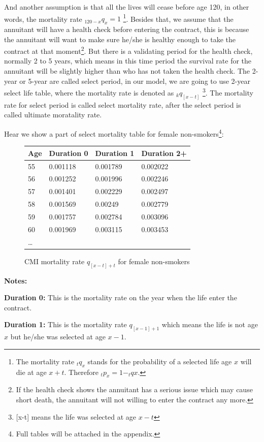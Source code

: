 \documentclass{report}
\begin{document}
And another assumption is that all the lives will cease before age 120, in other words, the mortality rate $_{120-x}q_{x}=1$ \footnote{The mortality rate $_tq_{x}$ stands for the probability of a selected life age $x$ will die at age $x+t$. Therefore $_tp_{x} = 1- _tq{x}$.}. Besides that, we assume that the annuitant will have a health check before entering the contract, this is because the annuitant will want to make sure he/she is healthy enough to take the contract at that moment\footnote{If the health check shows the annuitant has a serious issue which may cause short death, the annuitant will not willing to enter the contract any more.}. But there is a validating period for the health check, normally 2 to 5 years, which means in this time period the survival rate for the annuitant will be slightly higher than who has not taken the health check. The 2-year or 5-year are called select period, in our model, we are going to use 2-year select life table, where the mortality rate is denoted as $_kq_{[x-t]}$ \footnote{[x-t] means the life was selected at age $x-t$}. The mortality rate for select period is called select mortality rate, after the select period is called ultimate moratality rate.

Hear we show a part of select mortality table for female non-smokers\footnote{Full tables will be attached in the appendix.}:



\begin{figure}[H]
    \centering
\begin{tabular}{p{2cm}p{2cm}p{2cm}p{2cm}}
Age              & Duration 0 & Duration 1 & Duration 2+    \\
\hline
55&0.001118&0.001789&0.002022    \\
56&0.001252&0.001996&0.002246  \\
57&0.001401&0.002229&0.002497\\
58&0.001569&0.00249&0.002779\\
59&0.001757&0.002784&0.003096\\
60&0.001969&0.003115&0.003453\\
\dots
\end{tabular}
\caption{CMI mortality rate $q_{[x-t]+t}$ for female non-smokers}
\end{figure}

\textbf{Notes:}

\textbf{Duration 0:} This is the mortality rate on the year when the life enter the contract.

\textbf{Duration 1:} This is the mortality rate $q_{[x-1]+1}$ which means the life is not age $x$ but he/she was selected at age $x-1$.
\end{document}
